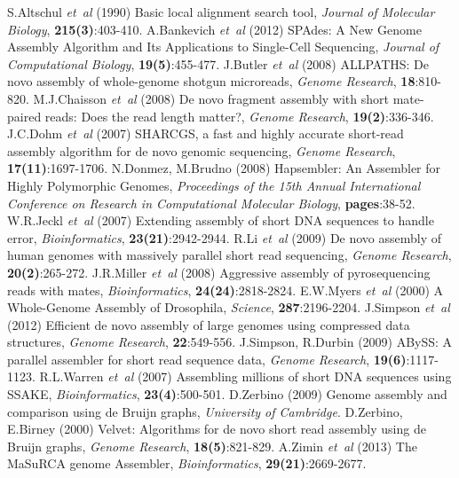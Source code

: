 \documentclass[12pt]{article}
\begin{document}
\newpage
%

%
%
\begin{thebibliography}{}
 S.Altschul {\it et~al} (1990) Basic local alignment search tool, \textit{Journal of Molecular Biology}, {\bf 215(3)}:403-410.
 A.Bankevich {\it et~al} (2012) SPAdes: A New Genome Assembly Algorithm and Its Applications to Single-Cell Sequencing, \textit{Journal of Computational Biology}, {\bf 19(5)}:455-477.
 J.Butler \textit{et~al} (2008) ALLPATHS: De novo assembly of whole-genome shotgun microreads, {\it Genome Research}, {\bf 18}:810-820.
 M.J.Chaisson \textit{et~al} (2008) De novo fragment assembly with short mate-paired reads: Does the read length matter?, \textit{Genome Research}, {\bf 19(2)}:336-346.
 J.C.Dohm \textit{et~al} (2007) SHARCGS, a fast and highly accurate short-read assembly algorithm for de novo genomic sequencing, \textit{Genome Research}, {\bf 17(11)}:1697-1706.
 N.Donmez, M.Brudno (2008) Hapsembler: An Assembler for Highly Polymorphic Genomes, \textit{Proceedings of the 15th Annual International Conference on Research in Computational Molecular Biology}, {\bf pages}:38-52.
 W.R.Jeckl \textit{et~al} (2007) Extending assembly of short DNA sequences to handle error, \textit{Bioinformatics}, {\bf 23(21)}:2942-2944.
 R.Li \textit{et~al} (2009) De novo assembly of human genomes with massively parallel short read sequencing, \textit{Genome Research}, {\bf 20(2)}:265-272.
 J.R.Miller \textit{et~al} (2008) Aggressive assembly of pyrosequencing reads with mates, \textit{Bioinformatics}, {\bf 24(24)}:2818-2824.
 E.W.Myers \textit{et~al} (2000) A Whole-Genome Assembly of Drosophila, \textit{Science}, {\bf 287}:2196-2204.
 J.Simpson \textit{et~al} (2012) Efficient de novo assembly of large genomes using compressed data structures, \textit{Genome Research}, {\bf 22}:549-556.
 J.Simpson, R.Durbin (2009) ABySS: A parallel assembler for short read sequence data, \textit{Genome Research}, {\bf 19(6)}:1117-1123.
 R.L.Warren \textit{et~al} (2007) Assembling millions of short DNA sequences using SSAKE, \textit{Bioinformatics}, {\bf 23(4)}:500-501.
 D.Zerbino (2009) Genome assembly and comparison using de Bruijn graphs, \textit{University of Cambridge}.
 D.Zerbino, E.Birney (2000) Velvet: Algorithms for de novo short read assembly using de Bruijn graphs, \textit{Genome Research}, {\bf 18(5)}:821-829.
 A.Zimin \textit{et~al} (2013) The MaSuRCA genome Assembler, \textit{Bioinformatics}, {\bf 29(21)}:2669-2677.

\end{thebibliography}
\end{document}
